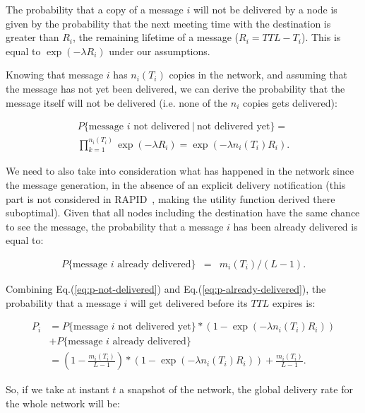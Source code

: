 The probability that a copy of a message $i$ will not be delivered by a node is given by the probability that the next meeting time with the destination is greater than $R_i$, the remaining lifetime of a message ($R_{i} = TTL - T_{i}$). This is equal to $\exp(-\lambda{R_i})$ under our assumptions.

Knowing that message $i$ has $n_i(T_i)$ copies in the network, and assuming that the message has not yet been delivered, we can derive the probability that the message itself will not be delivered (i.e. none of the $n_{i}$ copies gets delivered):

\begin{eqnarray}
P\{\mbox{message\ $i$ not\ delivered}\ |\ \mbox{not\ delivered\ yet}  \}= \nonumber \\
\prod_{k=1}^{n_i(T_i)}\exp(-\lambda R_i ) = \exp(-\lambda n_i(T_i) R_i).
\label{eq:p-not-delivered}
\end{eqnarray}

We need to also take into consideration what has happened in the network since the message generation, in the absence of an explicit delivery notification (this part is not considered in RAPID~\cite{Levine:Sigcomm07}, making the utility function derived there suboptimal). Given that all nodes including the destination have the same chance to see the message, the probability that a message $i$ has been already delivered is equal to:

\begin{align}
P \{ \mbox{message\ $i$ already\ delivered} \} &=& m_i(T_i) / (L-1).
\label{eq:p-already-delivered}
\end{align}

Combining Eq.(\ref{eq:p-not-delivered}) and Eq.(\ref{eq:p-already-delivered}), the probability that a message $i$ will get delivered before its $TTL$ expires is:

\vspace{-0.4cm}
\small
\begin{align*}
P_i & =  P \{ \mbox{message\ $i$ not\ delivered\ yet} \} *  (1 -\exp(-\lambda n_i(T_i) R_i)) \\
& +  P \{ \mbox{message\ $i$ already delivered} \} \\
& =  (1 - \frac{m_i(T_i)}{L-1})*(1 - \exp(-\lambda n_i(T_i) R_i ))+\frac{m_i(T_i)}{L-1}.
\end{align*}
\normalsize

So, if we take at instant $t$ a snapshot of the network, the global delivery rate for the whole network will be:

